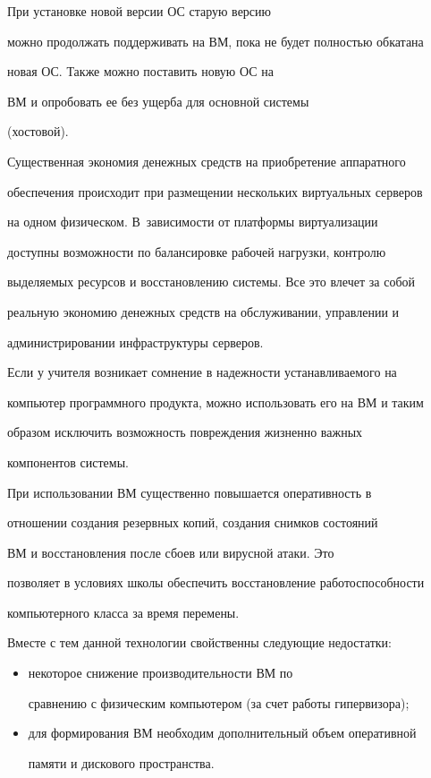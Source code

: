 При установке новой версии ОС старую версию 


можно продолжать поддерживать на ВМ, пока не будет полностью обкатана 


новая ОС. Также можно поставить новую ОС на 


ВМ и опробовать ее без ущерба для основной системы 


(хостовой). 





Существенная экономия денежных средств на приобретение аппаратного 


обеспечения происходит при размещении нескольких виртуальных серверов 


на одном физическом. В~зависимости от платформы виртуализации 


доступны воз\-мож\-ности по балансировке рабочей нагрузки, контролю 


выделяемых ресурсов и восстановлению системы. Все это влечет за собой 


реальную экономию денежных средств на обслуживании, управлении и 


администрировании инфраструктуры серверов. 





Если у учителя возникает сомнение в надежности устанавливаемого на 


компьютер программного продукта, можно использовать его на ВМ и таким 


образом исключить возможность повреждения жизненно важных 


компонентов системы.





При использовании ВМ существенно повышается оперативность в 


отношении создания резервных копий, создания снимков состояний 


ВМ и восстановления после сбоев или вирусной атаки. Это 


позволяет в условиях школы обеспечить восстановление работоспособности 


компьютерного класса за время перемены.





Вместе с тем данной технологии свойственны следующие недостатки:


\begin{itemize}


\item  некоторое снижение производительности ВМ по 


сравнению с физическим компьютером (за счет работы гипервизора);


\item для формирования ВМ необходим дополнительный объем оперативной 


памяти и дискового пространства.


\end{itemize}





